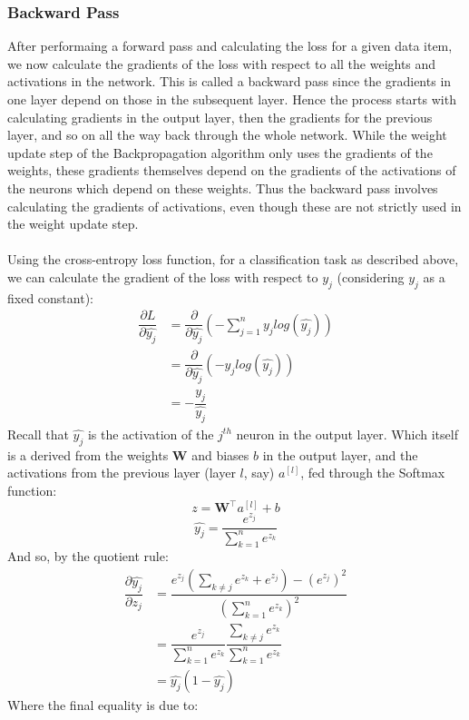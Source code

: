 \documentclass[11pt]{article} %
\theoremstyle{plain}
\theoremstyle{definition}
\begin{document}
\subsubsection{Backward Pass}
After performaing a forward pass and calculating the loss for a given data item, we now calculate the gradients of the loss with respect to all the weights and activations in the network. This is called a backward pass since the gradients in one layer depend on those in the subsequent layer. Hence the process starts with calculating gradients in the output layer, then the gradients for the previous layer, and so on all the way back through the whole network. While the weight update step of the Backpropagation algorithm only uses the gradients of the weights, these gradients themselves depend on the gradients of the activations of the neurons which depend on these weights. Thus the backward pass involves calculating the gradients of activations, even though these are not strictly used in the weight update step. 
\\
\\
\noindent
Using the cross-entropy loss function, for a classification task as described above, we can calculate the gradient of the loss with respect to $\hat{y_j}$ (considering \(y_j\) as a fixed constant):
\begin{align*}
\dfrac{\partial  L}{\partial \hat{y_j}} &= \dfrac{\partial }{\partial \hat{y_j}}(- \sum_{j=1}^n y_jlog(\hat{y_j})) \\
&= \dfrac{\partial }{\partial \hat{y_j}}(-y_jlog(\hat{y_j})) \\
&= -\dfrac{y_j}{\hat{y_j}}
\end{align*}
Recall that $\hat{y_j}$ is the activation of the \(j^{th}\) neuron in the output layer. Which itself is a derived from the weights \(\mathbf{W}\) and biases \(b\) in the output layer, and the activations from the previous layer (layer \(l\), say) \(a^{[l]}\), fed through the Softmax function:
\[ z = \mathbf{W^{\top}}a^{[l]} + b\]   
\[ \hat{y_j} = \dfrac{e^{z_j}}{\sum_{k=1}^n e^{z_k}} \]
And so, by the quotient rule:
\begin{align*}
\dfrac{\partial  \hat{y_j}}{\partial z_j} &= \dfrac{e^{z_j}(\sum_{k \neq j}e^{z_k}+e^{z_j}) - (e^{z_j})^2}{(\sum_{k=1}^n e^{z_k})^2} \\
&= \dfrac{e^{z_j}}{\sum_{k=1}^n e^{z_k}} \dfrac{\sum_{k \neq j}e^{z_k}}{\sum_{k=1}^n e^{z_k}} \\
&= \hat{y_j}(1-\hat{y_j})
\end{align*}
Where the final equality is due to:
\end{document}
